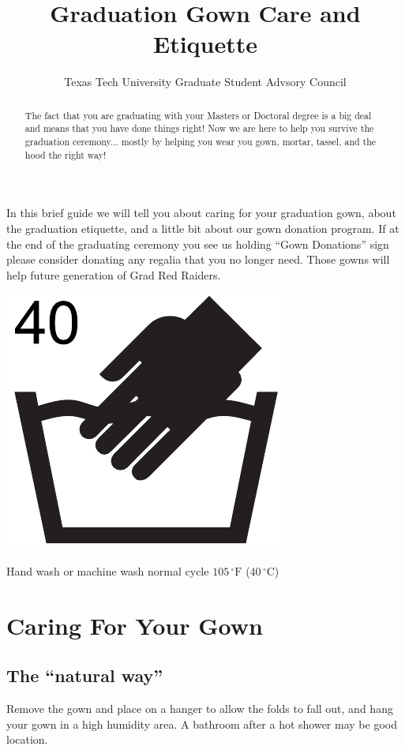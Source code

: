 \documentclass{tufte-handout}
\title{Graduation Gown Care and Etiquette}
\author[Texas Tech University Graduate Student Advsory Council]{Texas Tech University Graduate Student Advsory Council}
\date{}  %
\begin{document}
\enlargethispage{\baselineskip}

\maketitle%


\begin{abstract}
\noindent The fact that you are graduating with your Masters or Doctoral degree is a big deal and means that you have done things right! Now we are here to help you survive the graduation ceremony... mostly by helping you wear you gown, mortar, tassel, and the hood the right way!
\end{abstract}

\noindent In this brief guide we will tell you about caring for your graduation gown, about the graduation etiquette, and a little bit about our gown donation program. If at the end of the graduating ceremony you see us holding ``Gown Donations'' sign please consider donating any regalia that you no longer need. Those gowns will help future generation of Grad Red Raiders.

\begin{marginfigure}[-16\baselineskip]%
\hspace*{0.02in}
  \includegraphics[width=.35\linewidth]{hand-40C}
  \caption{\linespread{1.3}\selectfont{}Hand wash or \hspace{\textwidth}machine wash normal cycle \hspace{\textwidth}$105\,^{\circ}\mathrm{F}$ ($40\,^{\circ}\mathrm{C}$)}
  \label{fig:40C}
\end{marginfigure}

\section{Caring For Your Gown}\label{sec:page-layout}

\subsection{The ``natural way''}
Remove the gown and place on a hanger to allow the folds to fall out, and hang your gown in a high humidity area. A bathroom after a hot shower may be good location.
\end{document}
